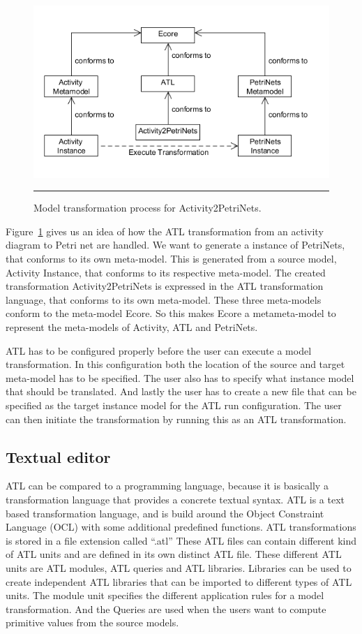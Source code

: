 \begin{figure}[H]
	\centering
	\includegraphics[scale=0.55]{figures/ATL.png}
	\rule{35em}{0.5pt}
	\caption[Model transformation for Atlas transformation language]
	{Model transformation process for Activity2PetriNets.}
	\label{fig:ATL}
\end{figure}

Figure~\ref{fig:ATL} gives us an idea of how the ATL transformation from an activity
diagram to Petri net are handled. We want to generate a instance of PetriNets,
that conforms to its own meta-model. This is generated from a source
model, Activity Instance, that conforms to its respective meta-model.
The created transformation Activity2PetriNets is expressed in the ATL
transformation  language, that conforms to its own meta-model. These three
meta-models conform to the meta-model Ecore. So this makes Ecore a metameta-model
to represent the meta-models of Activity, ATL and PetriNets.

ATL has to be configured properly before the user can execute a model
transformation. In this configuration both the location of the source and target
meta-model has to be specified. The user also has to specify what instance model
that should be translated. And lastly the user has to create a new file that can
be specified as the target instance model for the ATL run configuration. The
user can then initiate the transformation by running this as an ATL
transformation.


\subsection{Textual editor}

ATL can be compared to a programming language, because it is
basically a transformation language that provides a concrete textual syntax. ATL
is a text based transformation language, and is build around the Object
Constraint Language (OCL) \cite{OCL} with some additional predefined functions.
ATL transformations is stored in a file extension called ``.atl'' These ATL
files can contain different kind of ATL units and are defined in its own
distinct ATL file. These different ATL units are ATL modules, ATL queries and
ATL libraries. Libraries can be used to create independent ATL libraries that
can be imported to different types of ATL units. The module unit specifies the
different application rules for a  model transformation. And the Queries are
used when the users want to compute primitive values from the source models.

